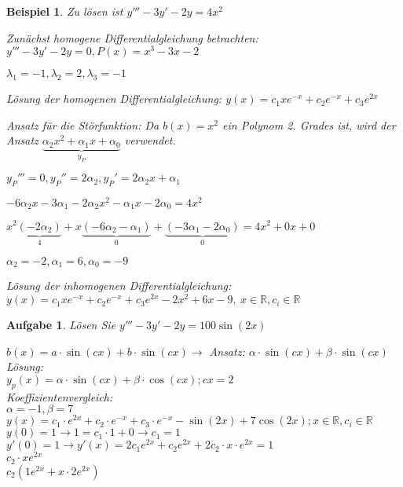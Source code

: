 \documentclass[fontset=ubuntu,12pt,a4paper]{scrreprt}
\newtheorem{beispiel}[defi]{Beispiel}
\newtheorem{aufg}[defi]{Aufgabe}
\begin{document}
     \begin{beispiel}
        Zu lösen ist \(y'''-3y'-2y=4x^2\)

        Zunächst homogene Differentialgleichung betrachten: \(y'''-3y'-2y=0,P(x)=x^3-3x-2\)

        \(\lambda_1=-1,\lambda_2=2,\lambda_3=-1\)

        Lösung der homogenen Differentialgleichung: \(y(x)=c_1xe^{-x}+c_2e^{-x}+c_3e^{2x}\)

        Ansatz für die Störfunktion: Da \(b(x)=x^2\) ein Polynom 2. Grades ist, wird der Ansatz \(\underbrace{\alpha_2x^2+\alpha_1x+\alpha_0}_{y_P}\) verwendet.

        \({y_P}'''=0,{y_P}''=2\alpha_2,{y_P}'=2\alpha_2x+\alpha_1\)

        \(-6\alpha_2x-3\alpha_1-2\alpha_2x^2-\alpha_1x-2\alpha_0=4x^2\)

        \(x^2\underbrace{(-2\alpha_2)}_4+x\underbrace{(-6\alpha_2-\alpha_1)}_0+\underbrace{(-3\alpha_1-2\alpha_0)}_0=4x^2+0x+0\)

        \(\alpha_2=-2,\alpha_1=6,\alpha_0=-9\)

        Lösung der inhomogenen Differentialgleichung: \(y(x)=c_1xe^{-x}+c_2e^{-x}+c_3e^{2x}-2x^2+6x-9,\ x\in\mathbb{R},c_i\in\mathbb{R}\)
     \end{beispiel}

     \begin{aufg}
         Lösen Sie \(y'''-3y'-2y=100\sin(2x)\)

         \(b(x)=a \cdot \sin(cx) + b \cdot \sin(cx) \to\) Ansatz: \(\alpha \cdot \sin(cx) + \beta \cdot \sin(cx)\) \\
         Lösung: \\
         \( y_p(x)=\alpha\cdot\sin(cx)+\beta\cdot\cos(cx); cx=2 \)
         \\ Koeffizientenvergleich: \\
         \(\alpha=-1, \beta=7\) \\
         \( y(x)=c_1\cdot e^{2x} + c_2\cdot e^{-x} +
          c_3 \cdot e^{-x} - \sin(2x) + 7\cos(2x); x\in \mathbb{R}, c_i\in \mathbb{R} \) \\
          \(y(0)=1 \rightarrow 1=c_1\cdot1+0 \rightarrow c_1=1 \) \\
          \( y'(0)=1 \rightarrow y'(x)=2c_1e^{2x}+c_2e^{2x}+2c_2\cdot x \cdot e^{2x} = 1 \) \\
          \(c_2\cdot xe^{2x}\) \\
          \(c_2(1e^{2x}+x\cdot 2e^{2x})\)
     \end{aufg}
\end{document}
